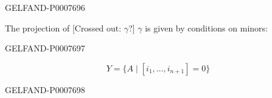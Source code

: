 \begin{GelfandAdjacentEvidence}{GELFAND-P000769}{6}


The projection of [Crossed out: \(\gamma\)?] \(\gamma\) is given by conditions on minors:
\end{GelfandAdjacentEvidence}
\begin{GelfandAdjacentEvidence}{GELFAND-P000769}{7}

\begin{equation*}
\tag{6}
Y=\{A\mid[i_1,\ldots,i_{n+1}]=0\}
\end{equation*}
\end{GelfandAdjacentEvidence}
\begin{GelfandAdjacentEvidence}{GELFAND-P000769}{8}

\end{GelfandAdjacentEvidence}



